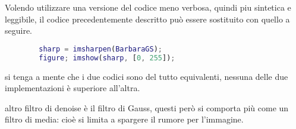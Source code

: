 \documentclass{subfiles}
\begin{document}
Volendo utilizzare una versione del codice meno verbosa, quindi piu sintetica e leggibile, il codice precedentemente descritto può essere sostituito con quello a seguire.
\begin{center}
    \begin{lstlisting}[language = MATLAB]
        % caricamento di BarbaraGS.png
        sharp = imsharpen(BarbaraGS);
        figure; imshow(sharp, [0, 255]);
    \end{lstlisting}
\end{center}

\begin{Remark*}
    si tenga a mente che i due codici sono del tutto equivalenti, nessuna delle due implementazioni è superiore all'altra.
\end{Remark*}

\begin{Note*}
    altro filtro di denoise è il filtro di Gauss, questi però si comporta più come un filtro di media: cioè si limita a spargere il rumore per l'immagine.
\end{Note*}
\end{document}
